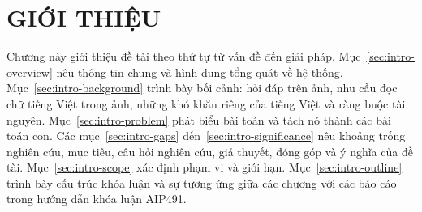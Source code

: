 
\chapter{GIỚI THIỆU}
\label{chap:intro}

\ifpdf
    \graphicspath{{Chapter1/Figs/Raster/}{Chapter1/Figs/PDF/}{Chapter1/Figs/}}
\else
    \graphicspath{{Chapter1/Figs/Vector/}{Chapter1/Figs/}}
\fi


Chương này giới thiệu đề tài theo thứ tự từ vấn đề đến giải pháp.
Mục~\ref{sec:intro-overview} nêu thông tin chung và hình dung tổng quát về hệ
thống. Mục~\ref{sec:intro-background} trình bày bối cảnh: hỏi đáp trên ảnh, nhu
cầu đọc chữ tiếng Việt trong ảnh, những khó khăn riêng của tiếng Việt và ràng buộc
tài nguyên. Mục~\ref{sec:intro-problem} phát biểu bài toán và tách nó thành các
bài toán con. Các mục~\ref{sec:intro-gaps} đến~\ref{sec:intro-significance} nêu
khoảng trống nghiên cứu, mục tiêu, câu hỏi nghiên cứu, giả thuyết, đóng góp và ý
nghĩa của đề tài. Mục~\ref{sec:intro-scope} xác định phạm vi và giới hạn. Mục~\ref{sec:intro-outline} trình bày cấu trúc khóa luận và sự tương ứng giữa các chương với các báo cáo trong hướng dẫn khóa luận AIP491.

